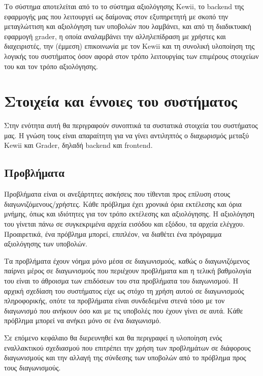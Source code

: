 \documentclass[diploma]{softlab-thesis}
\begin{document}
Το σύστημα αποτελείται από το το σύστημα αξιολόγησης Kewii, το backend της
εφαρμογής μας που λειτουργεί ως δαίμονας στον εξυπηρετητή με σκοπό την
μεταγλώττιση και αξιολόγηση των υποβολών που λαμβάνει, και από τη διαδικτυακή
εφαρμογή grader, η οποία αναλαμβάνει την αλληλεπίδραση με χρήστες και
διαχειριστές, την (έμμεση) επικοινωνία με τον Kewii και τη συνολική υλοποίηση
της λογικής του συστήματος όσον αφορά στον τρόπο λειτουργίας των επιμέρους
στοιχείων του και τον τρόπο αξιολόγησης.

\section{Στοιχεία και έννοιες του συστήματος}

Στην ενότητα αυτή θα περιγραφούν συνοπτικά τα συστατικά στοιχεία του συστήματος
μας. Η γνώση τους είναι απαραίτητη για να γίνει αντιληπτός ο διαχωρισμός μεταξύ
Kewii και Grader, δηλαδή backend και frontend.

\subsection{Προβλήματα}

Προβλήματα είναι οι ανεξάρτητες ασκήσεις που τίθενται προς επίλυση στους
διαγωνιζόμενους/χρήστες. Κάθε πρόβλημα έχει χρονικά όρια εκτέλεσης και όρια
μνήμης, όπως και ιδιότητες για τον τρόπο εκτέλεσης και αξιολόγησης. Η
αξιολόγηση του γίνεται πάνω σε συγκεκριμένα αρχεία εισόδου και εξόδου, τα
αρχεία ελέγχου. Προαιρετικά, ένα πρόβλημα μπορεί, επιπλέον, να διαθέτει ένα
πρόγραμμα αξιολόγησης των υποβολών.

\bigskip

Τα προβλήματα έχουν νόημα μόνο μέσα σε διαγωνισμούς, καθώς ο διαγωνιζόμενος
παίρνει μέρος σε διαγωνισμούς που περιέχουν προβλήματα και η τελική βαθμολογία
του είναι το άθροισμα των επιδόσεων του στα προβλήματα του διαγωνισμού. Η
αρχική σχεδίαση του συστήματος είχε ως στόχο τη χρήση αυτού σε διαγωνισμούς
πληροφορικής, οπότε τα προβλήματα είναι συνδεδεμένα στενά τόσο με τον
διαγωνισμό που ανήκουν όσο και με τις υποβολές που έχουν γίνει σε αυτά. Κάθε
πρόβλημα μπορεί να ανήκει μόνο σε ένα διαγωνισμό.

\bigskip

Σε επόμενο κεφάλαιο θα διερευνηθεί και θα περιγραφεί η υλοποίηση ενός εναλλακτικού
σχεδιασμού που επιτρέπει την χρήση των προβλημάτων σε διάφορους διαγωνισμούς και
την αλλαγή της σύνδεσης των υποβολών από το πρόβλημα προς τους διαγωνισμούς.
\end{document}
